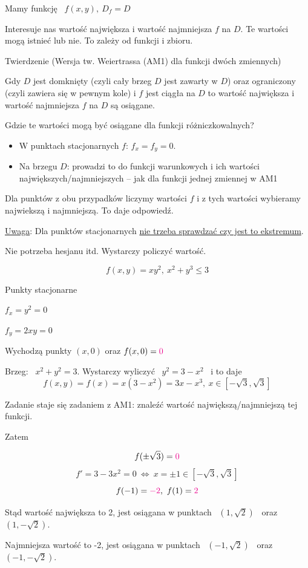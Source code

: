 Mamy funkcję \ $ f(x,y), \ D_f = D $

Interesuje nas wartość największa i wartość najmniejsza $f$ na $D$. Te wartości mogą istnieć lub nie. To zależy od funkcji i zbioru.
\bigskip

\begin{tw}{Twierdzenie (Wersja tw. Weiertrassa (AM1) dla funkcji dwóch zmiennych)}

Gdy $D$ jest domknięty (czyli cały brzeg $D$ jest zawarty w $D$) oraz ograniczony (czyli zawiera się w pewnym kole) i $f$ jest ciągła
na $D$ to wartość największa i wartość najmniejsza $f$ na $D$ są osiągane.
\end{tw}
\bigskip

Gdzie te wartości mogą być osiągane dla funkcji różniczkowalnych?
\begin{itemize}
    \item W punktach stacjonarnych $f$: $ f_x = f_y = 0 $.
    \item Na brzegu $D$: prowadzi to do funkcji warunkowych i ich wartości największych/najmniejszych -- jak dla funkcji jednej zmiennej w AM1
\end{itemize}
\bigskip

Dla punktów z obu przypadków liczymy wartości $f$ i z tych wartości wybieramy najwiekszą i najmniejszą. To daje odpowiedź.

\underline{Uwaga}: Dla punktów stacjonarnych \underline{nie trzeba sprawdzać czy jest to ekstremum}.

Nie potrzeba hesjanu itd. Wystarczy policzyć wartość.
\bigskip

\begin{przyklad}
\[ f(x,y) = xy^2, \ x^2 + y^3 \leq 3 \]

Punkty stacjonarne

$ f_x = y^2 = 0 $

$ f_y = 2xy = 0 $

Wychodzą punkty $ (x, 0) $ oraz $ f(x,0) = \textcolor{magenta}{0} $

Brzeg: \ $ x^2 + y^2 = 3 $. Wystarczy wyliczyć \ $ y^2 = 3 - x^2 $ \ i to daje
\[f(x,y) = f(x) = x(3-x^2) = 3x - x^3, \ x\in \left[-\sqrt3, \sqrt3 \right] \]

Zadanie staje się zadaniem z AM1: znaleźć wartość największą/najmniejszą tej funkcji.

Zatem

\[ f(\pm \sqrt3) = \textcolor{magenta}{0} \]
\[ f' = 3 - 3x^2 = 0 \ \Leftrightarrow \ x = \pm 1 \in \left[ -\sqrt3, \sqrt3 \right] \]
\[ f(-1) = \textcolor{magenta}{-2}, \ f(1) = \textcolor{magenta}{2} \]

Stąd wartość największa to 2, jest osiągana w punktach \ $(1, \sqrt2) $ \ oraz \ $ (1, -\sqrt2) $.

Najmniejsza wartość to -2, jest osiągana w punktach \ $(-1, \sqrt2) $ \ oraz \ $(-1, -\sqrt2) $.
\end{przyklad}


